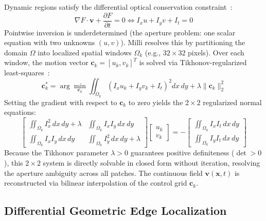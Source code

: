 \documentclass[11pt]{article}
\begin{document}
Dynamic regions satisfy the differential optical conservation constraint~\citep{hornschunck1981,lucaskanade1981}:
\begin{equation}
\nabla F \cdot \mathbf{v} + \frac{\partial F}{\partial t} = 0 \iff I_x u + I_y v + I_t = 0
\end{equation}
Pointwise inversion is underdetermined (the aperture problem: one scalar equation with two unknowns $(u, v)$). Milli resolves this by partitioning the domain $\Omega$ into localized spatial windows $\Omega_k$ (e.g., $32 \times 32$ pixels). Over each window, the motion vector $\mathbf{c}_k = [u_k, v_k]^T$ is solved via Tikhonov-regularized least-squares~\citep{tikhonov1977solutions}:
\begin{equation}
\mathbf{c}_k^* = \arg\min_{\mathbf{c}_k} \iint_{\Omega_k} \left( I_x u_k + I_y v_k + I_t \right)^2 dx\,dy + \lambda \|\mathbf{c}_k\|_2^2
\end{equation}
Setting the gradient with respect to $\mathbf{c}_k$ to zero yields the $2 \times 2$ regularized normal equations:
\begin{equation}
\begin{bmatrix} \iint_{\Omega_k} I_x^2\,dx\,dy + \lambda & \iint_{\Omega_k} I_x I_y\,dx\,dy \\ \iint_{\Omega_k} I_x I_y\,dx\,dy & \iint_{\Omega_k} I_y^2\,dx\,dy + \lambda \end{bmatrix} \begin{bmatrix} u_k \\ v_k \end{bmatrix} = - \begin{bmatrix} \iint_{\Omega_k} I_x I_t\,dx\,dy \\ \iint_{\Omega_k} I_y I_t\,dx\,dy \end{bmatrix}
\label{eq:normal_eq}
\end{equation}
Because the Tikhonov parameter $\lambda > 0$ guarantees positive definiteness ($\det > 0$), this $2 \times 2$ system is directly solvable in closed form without iteration, resolving the aperture ambiguity across all patches. The continuous field $\mathbf{v}(\mathbf{x}, t)$ is reconstructed via bilinear interpolation of the control grid $\mathbf{c}_k$.

\subsection{Differential Geometric Edge Localization}
\end{document}
